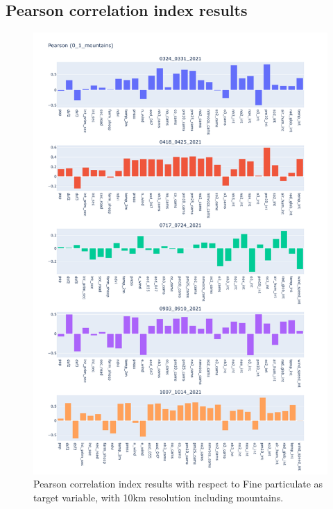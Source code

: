 \subsection{Pearson correlation index results}
\begin{figure}[H]
    \centering
    \includegraphics[scale=0.35]{images/tests/0_1_mountainspm25_st_pearson.png}
    \caption{Pearson correlation index results with respect to Fine particulate as target variable, with 10km resolution including mountains.}
    \label{fig:overview}
\end{figure}
